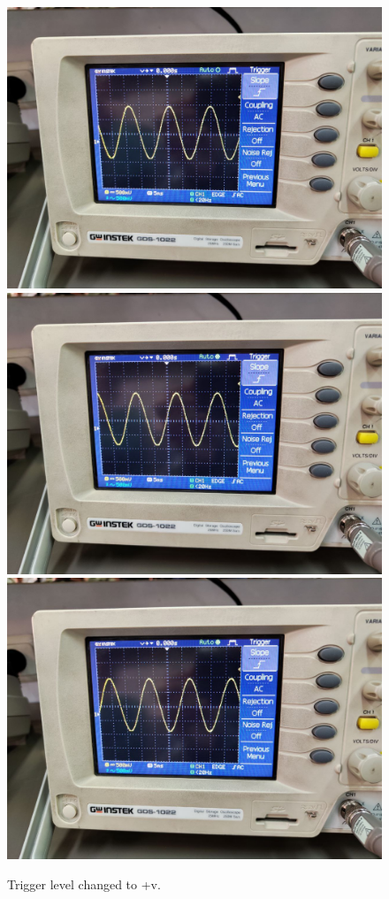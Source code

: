 \documentclass[11pt]{article}
\begin{document}
\begin{question}
{        \begin{figure}[H]
            \begin{center}
                \includegraphics[scale=0.1]{Fig/46.jpeg}
                \includegraphics[scale=0.1]{Fig/47.jpeg}
                \includegraphics[scale=0.1]{Fig/48.jpeg}
                \caption{Trigger level changed to +v.}
            \end{center}
        \end{figure}

}
\end{question}
\end{document}
